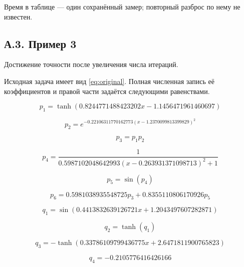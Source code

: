 Время в таблице --- один сохранённый замер; повторный разброс по нему не известен.

\clearpage

\subsection*{А.3. Пример 3}\label{app:ex3}

Достижение точности после увеличения числа итераций.

Исходная задача имеет вид \eqref{eq:original}. Полная численная запись её коэффициентов и правой части задаётся следующими равенствами.

\begin{equation}
p_{1}=\tanh{\left(0.8244771488423202 x - 1.1456471961460697 \right)}
\end{equation}


\begin{equation}
p_{2}=e^{- 0.22106311770162773 \left(x - 1.2370099813399829\right)^{2}}
\end{equation}


\begin{equation}
p_{3}=p_{1} p_{2}
\end{equation}


\begin{equation}
p_{4}=\frac{1}{0.5987102048642993 \left(x - 0.263931371098713\right)^{2} + 1}
\end{equation}


\begin{equation}
p_{5}=\sin{\left(p_{4} \right)}
\end{equation}


\begin{equation}
p_{6}=0.5981038935548725 p_{3} + 0.8355110806170926 p_{5}
\end{equation}


\begin{equation}
q_{1}=\sin{\left(0.4413832639126721 x + 1.2043497607282871 \right)}
\end{equation}


\begin{equation}
q_{2}=\tanh{\left(q_{1} \right)}
\end{equation}


\begin{equation}
q_{3}=- \tanh{\left(0.33786109799436775 x + 2.6471811900765823 \right)}
\end{equation}


\begin{equation}
q_{4}=-0.2105776416426166
\end{equation}


